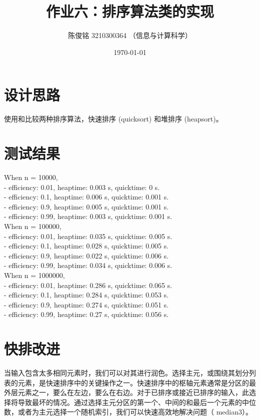 \documentclass[a4paper]{article}
\title{作业六：排序算法类的实现}
\author{陈俊铭 3210300364 （信息与计算科学）}
\date{\today}
\begin{document}
\maketitle
\section{设计思路}
使用和比较两种排序算法，快速排序 (quicksort) 和堆排序 (heapsort)。

\section{测试结果}
\noindent When n = 10000,\\
- efficiency: 0.01, heaptime: 0.003 s, quicktime: 0 s.\\
- efficiency: 0.1, heaptime: 0.006 s, quicktime: 0.001 s.\\
- efficiency: 0.9, heaptime: 0.005 s, quicktime: 0.001 s.\\
- efficiency: 0.99, heaptime: 0.003 s, quicktime: 0.001 s.\\

\noindent When n = 100000,\\
- efficiency: 0.01, heaptime: 0.035 s, quicktime: 0.005 s.\\
- efficiency: 0.1, heaptime: 0.028 s, quicktime: 0.005 s.\\
- efficiency: 0.9, heaptime: 0.022 s, quicktime: 0.006 s.\\
- efficiency: 0.99, heaptime: 0.034 s, quicktime: 0.006 s.\\

\noindent When n = 1000000,\\
- efficiency: 0.01, heaptime: 0.286 s, quicktime: 0.065 s.\\
- efficiency: 0.1, heaptime: 0.284 s, quicktime: 0.053 s.\\
- efficiency: 0.9, heaptime: 0.274 s, quicktime: 0.051 s.\\
- efficiency: 0.99, heaptime: 0.27 s, quicktime: 0.056 s.\\

\section{快排改进}
当输入包含太多相同元素时，我们可以对其进行润色。选择主元，或围绕其划分列表的元素，是快速排序中的关键操作之一。快速排序中的枢轴元素通常是分区的最外层元素之一，要么在左边，要么在右边。对于已排序或接近已排序的输入，此选择将导致最坏的情况。通过选择主元分区的第一个、中间的和最后一个元素的中位数，或者为主元选择一个随机索引，我们可以快速高效地解决问题（ median3）。
\end{document}
